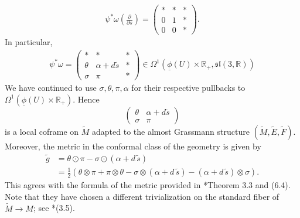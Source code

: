 \documentclass[11pt]{amsart}
\begin{document}
\begin{align*}
\psi^*\omega(\frac{\partial}{\partial s})=\left(\begin{array}{ccc}
		*&*&*\\
		0&1&*\\
		0&0&*
	\end{array}\right).
\end{align*}
In particular,
\begin{align*}
\psi^*\omega=\left(\begin{array}{ccc}
		*&*&*\\
		\theta&\alpha+d\tilde s&*\\
		\sigma&\pi&*
	\end{array}\right)\in\Omega^1(\underline\phi(U)\times\mathbb R_+,\mathfrak{sl}(3,\mathbb R))
\end{align*}
We have continued to use $\sigma,\theta,\pi,\alpha$ for their respective pullbacks to $\Omega^1(\underline\phi(U)\times\mathbb R_+)$. Hence \[\left(\begin{array}{cc}
		\theta&\alpha+d\tilde s\\
		\sigma&\pi
	\end{array}\right)\]
is a local coframe on $\tilde M$ adapted to the almost Grassmann structure $(\tilde M,\tilde E,\tilde F)$. Moreover, the metric in the conformal class of the geometry is given by
\begin{align*}
    \tilde g&=\theta\odot\pi-\sigma\odot(\alpha+d\,\tilde s)\\
    &=\frac 1 2(\theta\otimes\pi+\pi\otimes\theta-\sigma\otimes(\alpha+d\,\tilde s)-(\alpha+d\,\tilde s)\otimes\sigma).
\end{align*}
This agrees with the formula of the metric provided in  \cite{Ma+}*{Theorem 3.3 and (6.4)}. Note that they have chosen a different trivialization on the standard fiber of $\tilde M\to M$; see \cite{Ma+}*{(3.5)}.
\end{document}

